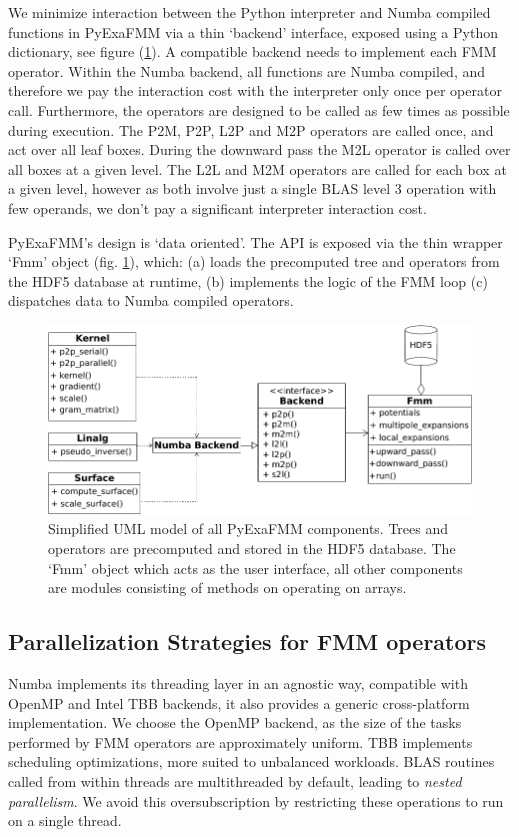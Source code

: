 \documentclass{IEEEcsmag}
\begin{document}
We minimize interaction between the Python interpreter and Numba compiled functions in PyExaFMM via a thin `backend' interface, exposed using a Python dictionary, see figure (\ref{fig:design}). A compatible backend needs to implement each FMM operator. Within the Numba backend, all functions are Numba compiled, and therefore we pay the interaction cost with the interpreter only once per operator call. Furthermore, the operators are designed to be called as few times as possible during execution. The P2M, P2P, L2P and M2P operators are called once, and act over all leaf boxes. During the downward pass the M2L operator is called over all boxes at a given level. The L2L and M2M operators are called for each box at a given level, however as both involve just a single BLAS level 3 operation with few operands, we don't pay a significant interpreter interaction cost.

PyExaFMM's design is `data oriented'. The API is exposed via the thin wrapper `Fmm' object (fig. \ref{fig:design}), which: (a) loads the precomputed tree and operators from the HDF5 database at runtime, (b) implements the logic of the FMM loop (c) dispatches data to Numba compiled operators.

\begin{figure}
	\centerline{\includegraphics {figures/software.pdf}}
	\caption{Simplified UML model of all PyExaFMM components. Trees and operators are precomputed and stored in the HDF5 database. The `Fmm' object which acts as the user interface, all other components are modules consisting of methods on operating on arrays.}
	\label{fig:design}
\end{figure}

\subsection{Parallelization Strategies for FMM operators}

Numba implements its threading layer in an agnostic way, compatible with OpenMP and Intel TBB backends, it also provides a generic cross-platform implementation. We choose the OpenMP backend, as the size of the tasks performed by FMM operators are approximately uniform. TBB implements scheduling optimizations, more suited to unbalanced workloads. BLAS routines called from within threads are multithreaded by default, leading to \textit{nested parallelism}. We avoid this oversubscription by restricting these operations to run on a single thread.
\end{document}
